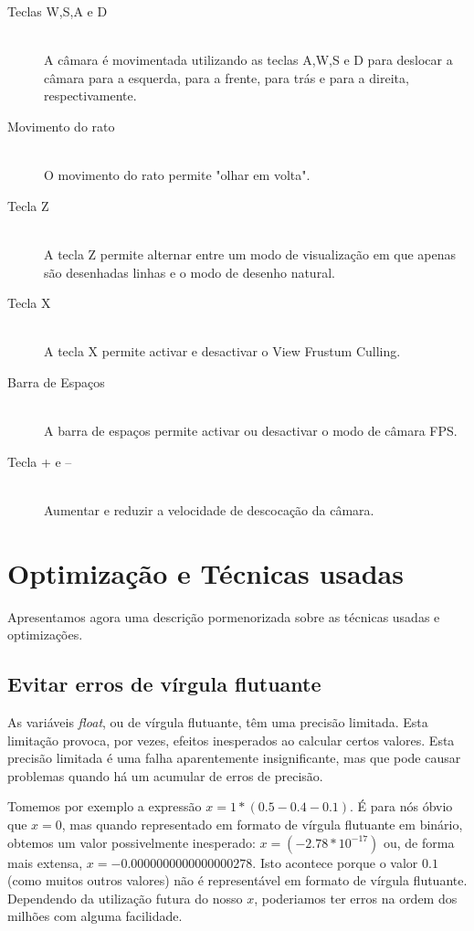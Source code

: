 \documentclass[a5paper,onecolumn, 11pt]{article}
\begin{document}
\begin{description}
	\item[Teclas W,S,A e D] \hfill \\
	A câmara é movimentada utilizando as teclas  A,W,S e D para deslocar a câmara para a esquerda, para a frente, para trás e para a direita, respectivamente.
	
	\item[Movimento do rato] \hfill \\
	O movimento do rato permite "olhar em volta".
		
	\item[Tecla Z] \hfill \\
	A tecla Z permite alternar entre um modo de visualização em que apenas são desenhadas linhas e o modo de desenho natural.
		
	\item[Tecla X] \hfill \\
	A tecla X permite activar e desactivar o View Frustum Culling.
	
	\item[Barra de Espaços] \hfill \\
	A barra de espaços permite activar ou desactivar o modo de câmara FPS.
	
	\item[Tecla + e --] \hfill \\
	Aumentar e reduzir a velocidade de descocação da câmara.
\end{description}

\newpage
\section{Optimização e Técnicas usadas}
Apresentamos agora uma descrição pormenorizada sobre as técnicas usadas e optimizações.

\subsection{Evitar erros de vírgula flutuante} \label{Erros de virgula flutuante}
As variáveis \textit{float}, ou de vírgula flutuante, têm uma precisão limitada. Esta limitação provoca, por vezes, efeitos inesperados ao calcular certos valores. Esta precisão limitada é uma falha aparentemente insignificante, mas que pode causar problemas quando há um acumular de erros de precisão.

Tomemos por exemplo a expressão $ x = 1*(0.5 - 0.4 - 0.1) $. É para nós óbvio que $x=0$, mas quando representado em formato de vírgula flutuante em binário, obtemos um valor possivelmente inesperado: $x = (-2.78*10^{-17})$ ou, de forma mais extensa, $x = -0.0000000000000000278$. Isto acontece porque o valor $0.1$ (como muitos outros valores) não é representável em formato de vírgula flutuante. Dependendo da utilização futura do nosso $x$, poderiamos ter erros na ordem dos milhões com alguma facilidade.
\end{document}
